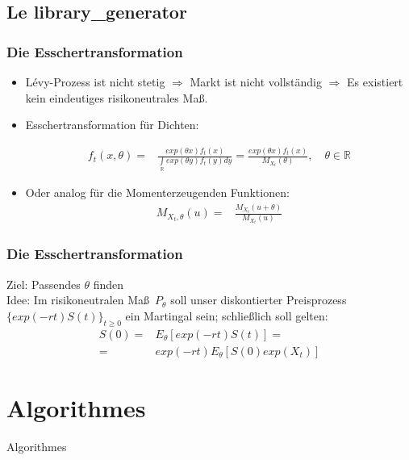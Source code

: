 \documentclass[handout]{beamer}
\newcommand{\tcb}{\color{blue}}
\begin{document}
\subsection{Le library\_generator}
\begin{frame}
\frametitle{\bf Die Esschertransformation}
\begin{itemize}
\item L\'evy-Prozess ist nicht stetig $\Rightarrow$ Markt ist nicht vollst\"andig
$\Rightarrow$ Es existiert kein eindeutiges risikoneutrales Ma\ss.\\

\item Esschertransformation f\"ur Dichten:

\begin{align*}
f_t(x,\theta)=&\frac{exp(\theta x)f_t(x)}{\int\limits_{\mathbb{R}}exp(\theta y)f_t(y)dy}=\frac{exp(\theta x)f_t(x)}{M_{X_t}(\theta)}, \quad \theta\in\mathbb{R}
\end{align*}
\item Oder analog f\"ur die Momenterzeugenden Funktionen:
\begin{align*}
M_{X_t,\theta}(u)=&\frac{M_{X_t}(u+\theta)}{M_{X_t}(u)}
\end{align*}
\end{itemize}
\end{frame}

\begin{frame}
\frametitle{\bf Die Esschertransformation}
{\tcb Ziel:} Passendes $\theta$ finden\\ \pause
{\tcb Idee:} Im risikoneutralen Ma\ss \ $P_\theta$ soll unser diskontierter Preisprozess $\{exp(-rt)S(t)\}_{t\ge0}$ ein Martingal sein; schlie\ss lich soll gelten:
\begin{align*}
S(0)=&E_\theta[exp(-rt)S(t)]= \\
=&exp(-rt)E_\theta[S(0)exp(X_t)]
\end{align*}
\end{frame}

\section{Algorithmes}

\begin{frame}
\begin{center}
{\Huge Algorithmes}
\end{center}
\end{frame}
\end{document}
